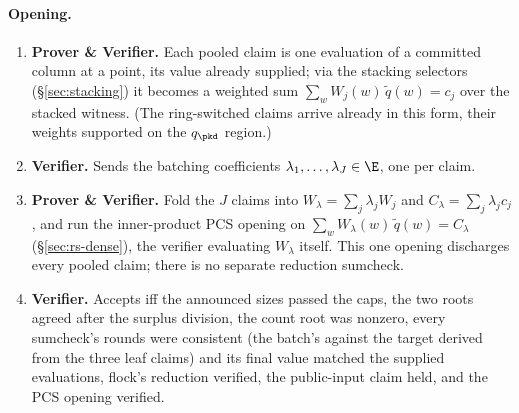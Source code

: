 \paragraph{Opening.}
\begin{enumerate}
\item \textbf{Prover \& Verifier.} Each pooled claim is one evaluation of a committed column at a point, its value already supplied; via the stacking selectors (\S\ref{sec:stacking}) it becomes a weighted sum $\sum_w W_j(w)\,\widetilde q(w)=c_j$ over the stacked witness. (The ring-switched claims arrive already in this form, their weights supported on the $q_\pkd$ region.)
\item \textbf{Verifier.} Sends the batching coefficients $\lambda_1,\dots,\lambda_J\in\E$, one per claim.
\item \textbf{Prover \& Verifier.} Fold the $J$ claims into $W_\lambda=\sum_j\lambda_j W_j$ and $C_\lambda=\sum_j\lambda_j c_j$, and run the inner-product PCS opening on $\sum_w W_\lambda(w)\,\widetilde q(w)=C_\lambda$ (\S\ref{sec:rs-dense}), the verifier evaluating $W_\lambda$ itself. This one opening discharges every pooled claim; there is no separate reduction sumcheck.
\item \textbf{Verifier.} Accepts iff the announced sizes passed the caps, the two roots agreed after the surplus division, the count root was nonzero, every sumcheck's rounds were consistent (the batch's against the target derived from the three leaf claims) and its final value matched the supplied evaluations, flock's reduction verified, the public-input claim held, and the PCS opening verified.
\end{enumerate}
